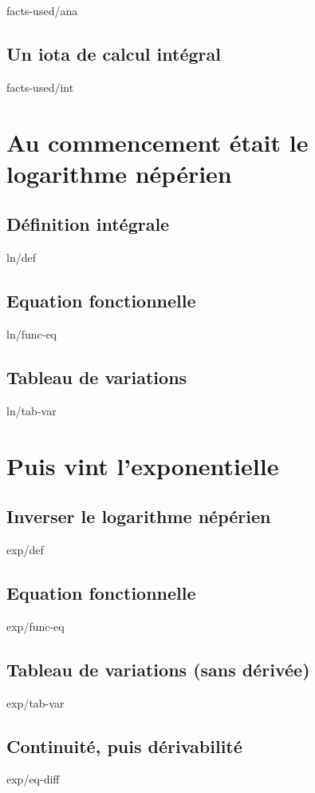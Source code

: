 \documentclass[12pt]{amsart}
\begin{document}
	{facts-used/ana}


	\subsection{Un iota de calcul intégral}

	{facts-used/int}




\section{Au commencement était le logarithme népérien}

	\subsection{Définition intégrale}

	{ln/def}


	\subsection{Equation fonctionnelle}

	{ln/func-eq}


	\subsection{Tableau de variations}

	{ln/tab-var}




\section{Puis vint l'exponentielle}

	\subsection{Inverser le logarithme népérien}

	{exp/def}


	\subsection{Equation fonctionnelle}

	{exp/func-eq}


	\subsection{Tableau de variations (sans dérivée)}

	{exp/tab-var}


	\subsection{Continuité, puis dérivabilité}

	{exp/eq-diff}
\end{document}
